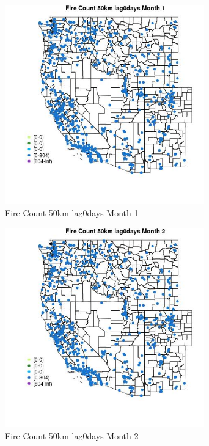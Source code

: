 \begin{figure} 
\centering  
\includegraphics[width=0.77\textwidth]{Code_Outputs/Report_ML_input_PM25_Step4_part_f_de_duplicated_aveswNAs_MapObsMo1Fire_Count_50km_lag0days.jpg} 
\caption{\label{fig:Report_ML_input_PM25_Step4_part_f_de_duplicated_aveswNAsMapObsMo1Fire_Count_50km_lag0days}Fire Count 50km lag0days Month 1} 
\end{figure} 
 

\begin{figure} 
\centering  
\includegraphics[width=0.77\textwidth]{Code_Outputs/Report_ML_input_PM25_Step4_part_f_de_duplicated_aveswNAs_MapObsMo2Fire_Count_50km_lag0days.jpg} 
\caption{\label{fig:Report_ML_input_PM25_Step4_part_f_de_duplicated_aveswNAsMapObsMo2Fire_Count_50km_lag0days}Fire Count 50km lag0days Month 2} 
\end{figure} 
 

